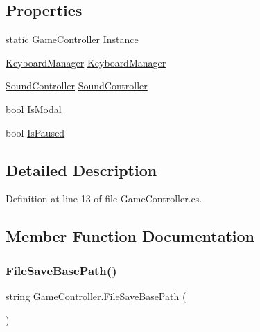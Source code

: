 \subsection*{Properties}
\begin{DoxyCompactItemize}
\item 
static \hyperlink{class_game_controller}{Game\+Controller} \hyperlink{class_game_controller_abe6246464a3deffea7bac0356478ba89}{Instance}
\item 
\hyperlink{class_keyboard_manager}{Keyboard\+Manager} \hyperlink{class_game_controller_a24eb670688aa60cfbf34d183ac8d9bd7}{Keyboard\+Manager}
\item 
\hyperlink{class_sound_controller}{Sound\+Controller} \hyperlink{class_game_controller_a1a047c3e2b0dd35810c7332008384bc6}{Sound\+Controller}
\item 
bool \hyperlink{class_game_controller_a61cb8435fc41507058b6dc08419408a2}{Is\+Modal}
\item 
bool \hyperlink{class_game_controller_aca24b8d6c493a65fd81c1ba6ce88cc7d}{Is\+Paused}
\end{DoxyCompactItemize}


\subsection{Detailed Description}


Definition at line 13 of file Game\+Controller.\+cs.



\subsection{Member Function Documentation}
\mbox{\label{class_game_controller_a6563e51093141ab23c0b7f8e8c2a5922}} 
\subsubsection{\texorpdfstring{File\+Save\+Base\+Path()}{FileSaveBasePath()}}
{\footnotesize\ttfamily string Game\+Controller.\+File\+Save\+Base\+Path (\begin{DoxyParamCaption}{ }\end{DoxyParamCaption})}




